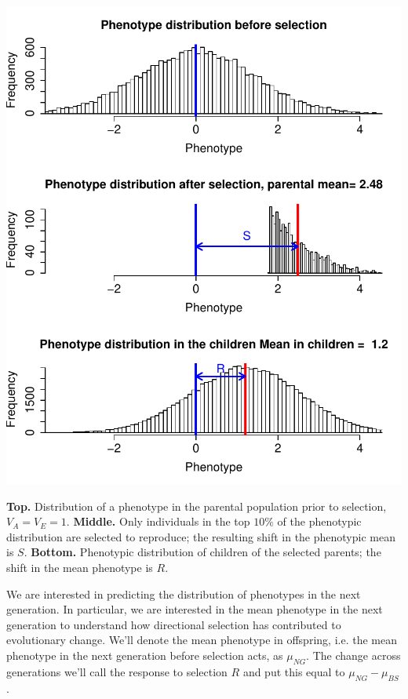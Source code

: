 \begin{marginfigure}
\begin{center}
\includegraphics[width=\textwidth]{figures/Response_to_sel/QT3.pdf}
\end{center}
\caption{{\bf Top.} Distribution of a phenotype in the parental population
  prior to selection, $V_A=V_E=1$. {\bf Middle.} Only individuals in the top $10\%$
  of the phenotypic distribution are selected to reproduce; the resulting shift
  in the phenotypic mean is $S$. {\bf Bottom.}  Phenotypic distribution of
  children of the selected parents; the shift in the mean phenotype is
$R. $}
\end{marginfigure}

We are interested in predicting the distribution of phenotypes in the next
generation. In particular, we are interested in the mean phenotype in
the next generation to understand how directional selection has
contributed to evolutionary change. We'll denote the mean phenotype in
offspring, i.e. the mean phenotype in the next generation before selection acts,
as $\mu_{NG}$. The change across generations we'll call the response
to selection $R$ and put this equal to $\mu_{NG}- \mu_{BS}$. \\



